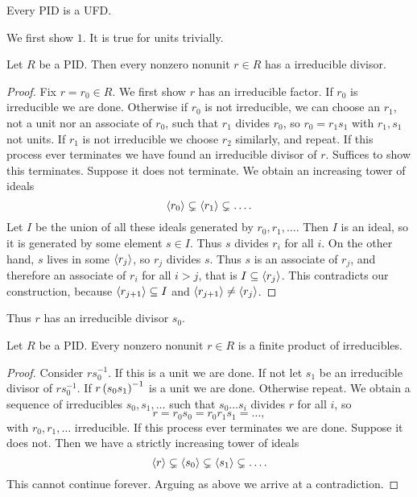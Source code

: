 \begin{theorem}
\label{thm:3.3.2}
Every PID is a UFD.
\end{theorem}

We first show $ 1 $. It is true for units trivially.

\begin{lemma}
Let $ R $ be a PID. Then every nonzero nonunit $ r \in R $ has a irreducible divisor.
\end{lemma}

\begin{proof}
Fix $ r = r_0 \in R $. We first show $ r $ has an irreducible factor. If $ r_0 $ is irreducible we are done. Otherwise if $ r_0 $ is not irreducible, we can choose an $ r_1 $, not a unit nor an associate of $ r_0 $, such that $ r_1 $ divides $ r_0 $, so $ r_0 = r_1s_1 $ with $ r_1, s_1 $ not units. If $ r_1 $ is not irreducible we choose $ r_2 $ similarly, and repeat. If this process ever terminates we have found an irreducible divisor of $ r $. Suffices to show this terminates. Suppose it does not terminate. We obtain an increasing tower of ideals
$$ \left\langle r_0 \right\rangle \subsetneq \left\langle r_1 \right\rangle \subsetneq \dots. $$
Let $ I $ be the union of all these ideals generated by $ r_0, r_1, \dots $. Then $ I $ is an ideal, so it is generated by some element $ s \in I $. Thus $ s $ divides $ r_i $ for all $ i $. On the other hand, $ s $ lives in some $ \left\langle r_j \right\rangle $, so $ r_j $ divides $ s $. Thus $ s $ is an associate of $ r_j $, and therefore an associate of $ r_i $ for all $ i > j $, that is $ I \subseteq \left\langle r_j \right\rangle $. This contradicts our construction, because $ \left\langle r_{j + 1} \right\rangle \subseteq I $ and $ \left\langle r_{j + 1} \right\rangle \ne \left\langle r_j \right\rangle $.
\end{proof}

Thus $ r $ has an irreducible divisor $ s_0 $.

\pagebreak

\begin{lemma}
Let $ R $ be a PID. Every nonzero nonunit $ r \in R $ is a finite product of irreducibles.
\end{lemma}

\begin{proof}
Consider $ rs_0^{-1} $. If this is a unit we are done. If not let $ s_1 $ be an irreducible divisor of $ rs_0^{-1} $. If $ r\left( s_0s_1 \right)^{-1} $ is a unit we are done. Otherwise repeat. We obtain a sequence of irreducibles $ s_0, s_1, \dots $ such that $ s_0 \dots s_i $ divides $ r $ for all $ i $, so
$$ r = r_0s_0 = r_0r_1s_1 = \dots, $$
with $ r_0, r_1, \dots $ irreducible. If this process ever terminates we are done. Suppose it does not. Then we have a strictly increasing tower of ideals
$$ \left\langle r \right\rangle \subsetneq \left\langle s_0 \right\rangle \subsetneq \left\langle s_1 \right\rangle \subsetneq \dots. $$
This cannot continue forever. Arguing as above we arrive at a contradiction.
\end{proof}

